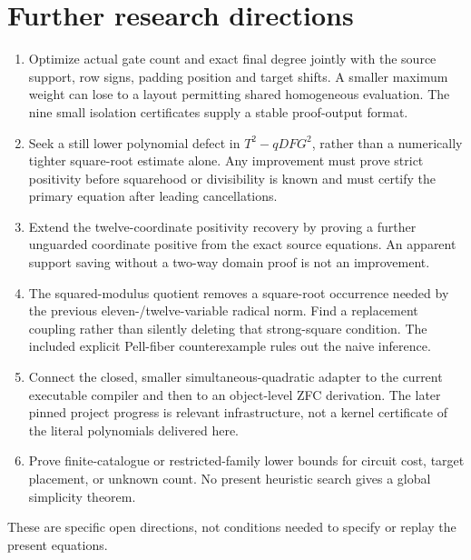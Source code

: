 \documentclass[11pt]{article}
\begin{document}
\section{Further research directions}
\begin{enumerate}
\item Optimize actual gate count and exact final degree jointly with the
source support, row signs, padding position and target shifts. A smaller
maximum weight can lose to a layout permitting shared homogeneous evaluation.
The nine small isolation certificates supply a stable proof-output format.
\item Seek a still lower polynomial defect in $T^2-qDFG^2$, rather than a
numerically tighter square-root estimate alone. Any improvement must prove
strict positivity before squarehood or divisibility is known and must
certify the primary equation after leading cancellations.
\item Extend the twelve-coordinate positivity recovery by proving a further
unguarded coordinate positive from the exact source equations. An apparent
support saving without a two-way domain proof is not an improvement.
\item The squared-modulus quotient removes a square-root occurrence needed
by the previous eleven-/twelve-variable radical norm. Find a replacement
coupling rather than silently deleting that strong-square condition. The
included explicit Pell-fiber counterexample rules out the naive inference.
\item Connect the closed, smaller simultaneous-quadratic adapter to the
current executable compiler and then to an object-level ZFC derivation.
The later pinned project progress is relevant infrastructure, not a kernel
certificate of the literal polynomials delivered here.
\item Prove finite-catalogue or restricted-family lower bounds for circuit
cost, target placement, or unknown count. No present heuristic search gives
a global simplicity theorem.
\end{enumerate}
These are specific open directions, not conditions needed to specify or
replay the present equations.
\end{document}
